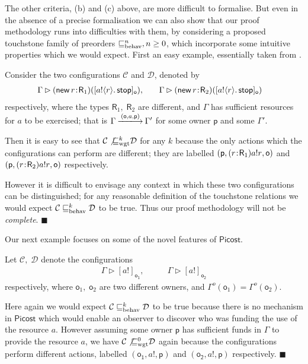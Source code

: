 \documentclass{LMCS}
\newcommand{\pfn}[1]{\mathsf{#1}}  \newcommand{\cfn}[1]{\mathsf{#1}}  \newcommand{\ownfnt}[1]{{\mathsf{#1}}}
\newcommand{\picost}{\ensuremath{\pfn{Picost}}\xspace}
\newcommand{\with}{\mathbin \rhd}
\newcommand{\cancom}[3]{({\ownfnt{#1}},{#2},{\ownfnt{#3}}) \xspace}
\newcommand{\amort}[1]{\mathrel{\sqsubseteq_{\rm wgt}^{#1}}}
\newcommand{\behav}[1]{\mathrel{\sqsubseteq_{\rm behav}^{#1}}}
\newcommand{\typeletter}[1]{{\mathsf{#1}}}
\newcommand{\tR}{\typeletter{R}}
\newcommand{\calC}{\mathcal{C}}
\newcommand{\calD}{\mathcal{D}}
\newcommand{\pc}[1]{\langle#1\rangle}
\newcommand{\Cassoc}[2]{ {{#1}\kern -0.2em : \kern -0.2em {#2}}}
\newcommand{\Cnew}[2]{(\mathop{\pfn{new}} \Cassoc{#1}{#2})}
\newcommand{\Cstop}{\mathop{\pfn{stop}}}
\newcommand{\Cloc}[2]{[#1]_{\ownfnt{#2}}}
\newcommand{\ar}[1]{\mathbin{\xlongrightarrow{ #1}}}
\newcommand{\EndDefBox}{\null\hfill$\blacksquare$}
\newcommand{\boxHere}{\global\let\EndProof\empty\EndDefBox}
\begin{document}
The other criteria, (b) and (c) above, are more difficult to formalise. But
even in the absence of a precise formalisation we can also show that
our proof methodology  runs into difficulties with them, by
considering a proposed touchstone family of preorders $\behav{n}, n \geq 0$, which incorporate
some intuitive properties which we would expect.
First an easy
example, essentially taken from \cite{pityping}.
\begin{exa}\label{ex:types}
  Consider the two configurations $\calC$ and $\calD$, denoted by
  \begin{align*}
\Gamma \with \Cnew{r}{\tR_1} (\Cloc{a!\pc{r}.\Cstop}{o}), \qquad&
\Gamma \with \Cnew{r}{\tR_2} (\Cloc{a!\pc{r}.\Cstop}{o}) 
  \end{align*}
 respectively, where the types $\tR_1,\;\tR_2$ are different, and $\Gamma$ has
  sufficient resources for $a$ to be exercised; that is $\Gamma
  \ar{\cancom{o}{a}{p}} \Gamma'$ for some owner $\ownfnt p$ and some
  $\Gamma'$.

Then it is easy to see that 
\begin{math}
 \calC
\not{\amort{k}}
\calD
\end{math}
for any $k$ because the only actions which the configurations can perform are different;
they are labelled  $\cancom{p}{(\Cassoc{r}{\tR_1})a!r}{o}$ and  
$\cancom{p}{(\Cassoc{r}{\tR_2})a!r}{o}$ respectively. 

However it is difficult to envisage any  context in which these two
configurations can be distinguished; for any reasonable definition of
the touchstone relations we would expect $\calC \behav{k} \calD$ to be
true.  Thus our proof methodology will not be \emph{complete}. \boxHere
\end{exa}
Our next example focuses on some of the novel features of \picost.
\begin{exa}\label{ex:own}
  Let $\calC,\; \calD$ denote the configurations
  \begin{align*}
    \Gamma \with \Cloc{a!}{o_1}, \qquad&
    \Gamma \with \Cloc{a!}{o_2}
  \end{align*}
respectively, where $\ownfnt o_1,\; \ownfnt o_2$ are two different owners, 
and $\Gamma^o(\ownfnt o_1) = \Gamma^o(\ownfnt o_2)$. 

Here again we would expect $\calC \behav{k} \calD$ to be true because
there is no mechanism in \picost which would enable an observer to discover
who was funding the use of the resource $a$.  However assuming some owner $\ownfnt p$
has sufficient funds in $\Gamma$ to provide the resource $a$, we have
\begin{math}
  \calC \not{\amort{0}} \calD
\end{math}
again because the configurations perform different actions, labelled
$\cancom{o_1}{a!}{p}$ and $\cancom{o_2}{a!}{p}$ respectively. \boxHere
\end{exa}
\end{document}
